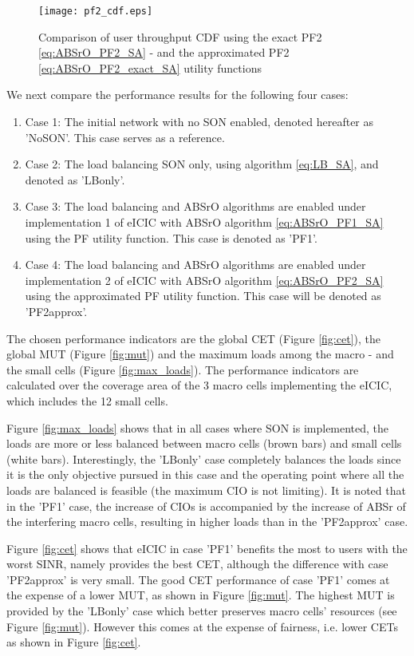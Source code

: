 \documentclass[conference]{IEEEtran}
\begin{document}
\begin{figure}[!ht]
\centering
\texttt{[image: pf2\_cdf.eps]}
\caption{Comparison of user throughput CDF using the exact PF2 \eqref{eq:ABSrO_PF2_SA} - and the approximated PF2 \eqref{eq:ABSrO_PF2_exact_SA} utility functions}
\label{fig:pf2_cdf}
\end{figure}

	We next compare the performance results for the following four cases:
	\begin{enumerate}
	\item Case 1: The initial network with no \ac{SON} enabled, denoted hereafter as 'NoSON'. This case serves as a reference.
	\item Case 2: The load balancing \ac{SON} only, using algorithm \eqref{eq:LB_SA}, and denoted as 'LBonly'.
	\item Case 3: The load balancing and \ac{ABSrO} algorithms are enabled under implementation 1 of \ac{eICIC} with \ac{ABSrO} algorithm \eqref{eq:ABSrO_PF1_SA} using the \ac{PF} utility function. This case is denoted as 'PF1'.
	\item Case 4: The load balancing and \ac{ABSrO} algorithms are enabled under implementation 2 of \ac{eICIC} with \ac{ABSrO} algorithm \eqref{eq:ABSrO_PF2_SA} using the approximated PF utility function. This case will be denoted as 'PF2approx'.
	\end{enumerate}
	
	The chosen performance indicators are the global \ac{CET} (Figure \ref{fig:cet}), the global \ac{MUT} (Figure \ref{fig:mut}) and the maximum loads among the macro - and the small cells (Figure \ref{fig:max_loads}). The performance indicators are calculated  over the coverage area of the 3 macro cells implementing the \ac{eICIC}, which includes the 12 small cells.
	
	Figure \ref{fig:max_loads} shows that in all cases where \ac{SON} is implemented, the loads are more or less balanced between macro cells (brown bars) and small cells (white bars). Interestingly, the 'LBonly' case completely balances the loads since it is the only objective pursued in this case and the operating point where all the loads are balanced is feasible (the maximum \ac{CIO} is not limiting).
It is noted that in the 'PF1' case, the increase of \acp{CIO} is accompanied by the increase of \ac{ABSr} of the interfering macro cells, resulting in higher loads than in the 'PF2approx' case.
	
Figure \ref{fig:cet} shows that \ac{eICIC} in case 'PF1' benefits the most to users with the worst \ac{SINR}, namely provides the best \ac{CET}, although the difference with case 'PF2approx' is very small. The good \ac{CET} performance of case 'PF1' comes at the expense of a lower \ac{MUT}, as shown in  Figure \ref{fig:mut}. The highest \ac{MUT} is provided by the 'LBonly' case which better preserves macro cells' resources (see Figure \ref{fig:mut}). However this comes at the expense of fairness, i.e. lower \acp{CET} as shown in Figure \ref{fig:cet}.
\end{document}

